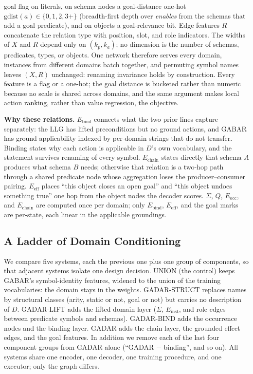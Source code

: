 \documentclass[letterpaper]{article} %
\newcommand{\gadar}{GADAR}                    %
\newcommand{\union}{UNION}                    %
\newcommand{\gstruct}{\gadar{}-STRUCT}        %
\newcommand{\glift}{\gadar{}-LIFT}            %
\newcommand{\gbind}{\gadar{}-BIND}            %
\begin{document}
goal flag on literals, on schema nodes a goal-distance one-hot
$\mathrm{gdist}(a) \in \{0, 1, 2, 3{+}\}$ (breadth-first depth over
\textit{enables} from the schemas that add a goal predicate), and on objects
a goal-relevance bit. Edge features $R$ concatenate the relation type with
position, slot, and role indicators. The widths of $X$ and $R$ depend only
on $(k_p, k_a)$; no dimension is the number of schemas, predicates, types,
or objects. One network therefore serves every domain, instances from
different domains batch together, and permuting symbol names leaves
$(X, R)$ unchanged: renaming invariance holds by construction. Every feature
is a flag or a one-hot; the goal distance is bucketed rather than numeric
because no scale is shared across domains, and the same argument makes local
action ranking, rather than value regression, the objective.

\textbf{Why these relations.} $E_{\mathrm{bind}}$ connects what the two
prior lines capture separately: the LLG has lifted preconditions but no
ground actions, and GABAR has ground applicability indexed by per-domain
strings that do not transfer. Binding states why each action is applicable
in $D$'s own vocabulary, and the statement survives renaming of every
symbol. $E_{\mathrm{chain}}$ states directly that schema $A$ produces what
schema $B$ needs; otherwise that relation is a two-hop path through a shared
predicate node whose aggregation loses the producer--consumer pairing.
$E_{\mathrm{eff}}$ places ``this object closes an open goal'' and ``this
object undoes something true'' one hop from the object nodes the decoder
scores. $\Sigma$, $Q$, $E_{\mathrm{occ}}$, and $E_{\mathrm{chain}}$ are
computed once per domain; only $E_{\mathrm{bind}}$, $E_{\mathrm{eff}}$, and
the goal marks are per-state, each linear in the applicable groundings.

\subsection{A Ladder of Domain Conditioning}

We compare five systems, each the previous one plus one group of
components, so that adjacent systems isolate one design decision.
\union{} (the control) keeps GABAR's symbol-identity features, widened to
the union of the training vocabularies: the domain stays in the weights.
\gstruct{} replaces names by structural classes (arity, static or not, goal
or not) but carries no description of $D$. \glift{} adds the lifted domain
layer ($\Sigma$, $E_{\mathrm{inst}}$, and role edges between predicate
symbols and schemas). \gbind{} adds the occurrence nodes and the binding
layer. \gadar{} adds the chain layer, the grounded effect edges, and the
goal features. In addition we remove each of the last four component groups
from \gadar{} alone (``\gadar{} $-$ binding'', and so on). All systems share
one encoder, one decoder, one training procedure, and one executor; only the
graph differs.
\end{document}

